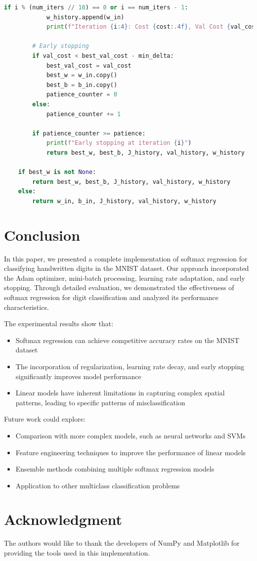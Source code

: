 \documentclass[10pt,journal,compsoc]{IEEEtran}
\begin{document}
\begin{lstlisting}[language=Python]
        if i % (num_iters // 10) == 0 or i == num_iters - 1:
            w_history.append(w_in)
            print(f"Iteration {i:4}: Cost {cost:.4f}, Val Cost {val_cost:.4f}")
        
        # Early stopping
        if val_cost < best_val_cost - min_delta:
            best_val_cost = val_cost
            best_w = w_in.copy()
            best_b = b_in.copy()
            patience_counter = 0
        else:
            patience_counter += 1
            
        if patience_counter >= patience:
            print(f"Early stopping at iteration {i}")
            return best_w, best_b, J_history, val_history, w_history
    
    if best_w is not None:
        return best_w, best_b, J_history, val_history, w_history
    else:
        return w_in, b_in, J_history, val_history, w_history
\end{lstlisting}

\section{Conclusion}
In this paper, we presented a complete implementation of softmax regression for classifying handwritten digits in the MNIST dataset. Our approach incorporated the Adam optimizer, mini-batch processing, learning rate adaptation, and early stopping. Through detailed evaluation, we demonstrated the effectiveness of softmax regression for digit classification and analyzed its performance characteristics.

The experimental results show that:
\begin{itemize}
    \item Softmax regression can achieve competitive accuracy rates on the MNIST dataset
    \item The incorporation of regularization, learning rate decay, and early stopping significantly improves model performance
    \item Linear models have inherent limitations in capturing complex spatial patterns, leading to specific patterns of misclassification
\end{itemize}

Future work could explore:
\begin{itemize}
    \item Comparison with more complex models, such as neural networks and SVMs
    \item Feature engineering techniques to improve the performance of linear models
    \item Ensemble methods combining multiple softmax regression models
    \item Application to other multiclass classification problems
\end{itemize}

\section*{Acknowledgment}
The authors would like to thank the developers of NumPy and Matplotlib for providing the tools used in this implementation.
\end{document}
